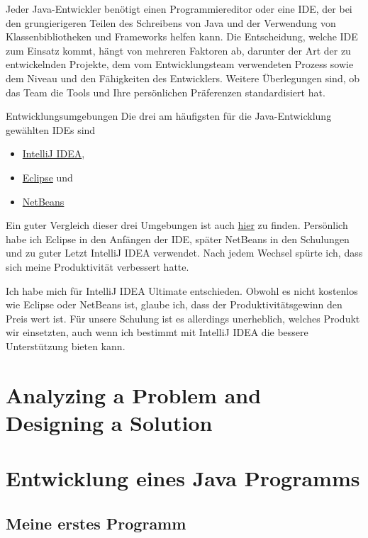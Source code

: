 Jeder Java-Entwickler benötigt einen Programmiereditor oder eine IDE, der bei den 
grungierigeren Teilen des Schreibens von Java und der Verwendung von Klassenbibliotheken 
und Frameworks helfen kann. Die Entscheidung, welche IDE zum Einsatz kommt, hängt von 
mehreren Faktoren ab, darunter der Art der zu entwickelnden Projekte, dem vom 
Entwicklungsteam verwendeten Prozess sowie dem Niveau und den Fähigkeiten des 
Entwicklers. Weitere Überlegungen sind, ob das Team die Tools und Ihre persönlichen 
Präferenzen standardisiert hat.

\begin{frame}{Entwicklungsumgebungen}
	Die drei am häufigsten für die Java-Entwicklung gewählten IDEs sind
	
    \begin{itemize}
		\item \href{https://www.jetbrains.com/idea}{IntelliJ IDEA},   
		\item \href{https://www.eclipse.org/}{Eclipse} und
		\item \href{https://netbeans.org/}{NetBeans}
    \end{itemize}
\end{frame}

Ein guter Vergleich dieser drei Umgebungen ist auch
\href{https://www.javaworld.com/article/3114167/development-tools/choosing-your-java-ide.html}
{hier} zu finden. Persönlich habe ich Eclipse in den Anfängen der IDE, später 
NetBeans in den Schulungen und zu guter Letzt IntelliJ IDEA verwendet. Nach 
jedem Wechsel spürte ich, dass sich meine Produktivität verbessert hatte.

Ich habe mich für IntelliJ IDEA Ultimate entschieden. Obwohl es nicht kostenlos 
wie Eclipse oder NetBeans ist, glaube ich, dass der Produktivitätsgewinn den 
Preis wert ist. Für unsere Schulung ist es allerdings unerheblich, welches 
Produkt wir einsetzten, auch wenn ich bestimmt mit IntelliJ IDEA die bessere 
Unterstützung bieten kann.


\section{Analyzing a Problem and Designing a Solution}


\section{Entwicklung eines Java Programms}

\subsection{Meine erstes Programm}

